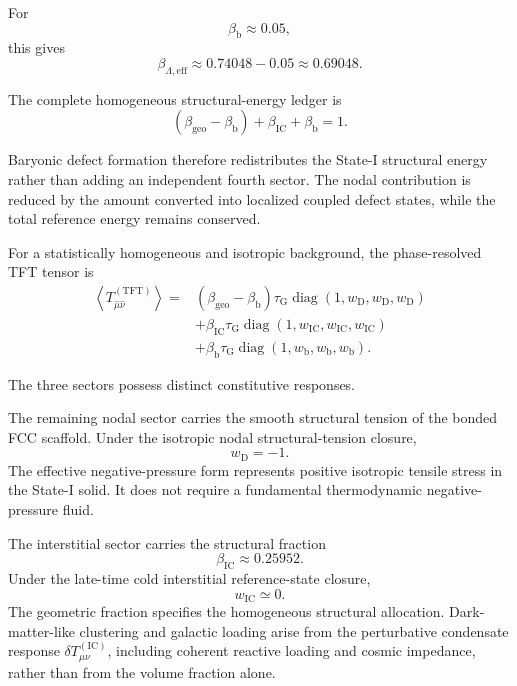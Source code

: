 For
\begin{equation}
    \beta_{\mathrm{b}} \approx 0.05,
\end{equation}
this gives
\begin{equation}
    \beta_{\Lambda,\mathrm{eff}} \approx 0.74048-0.05 \approx 0.69048.
\end{equation}

The complete homogeneous structural-energy ledger is
\begin{equation}
    \left( \beta_{\mathrm{geo}} - \beta_{\mathrm{b}} \right) + \beta_{\mathrm{IC}} + \beta_{\mathrm{b}} = 1.
\end{equation}

Baryonic defect formation therefore redistributes the State-I structural energy rather than adding an independent fourth sector. The nodal contribution is reduced by the amount converted into localized coupled defect states, while the total reference energy remains conserved.

For a statistically homogeneous and isotropic background, the phase-resolved TFT tensor is
\begin{equation}
\begin{aligned}
    \left\langle T_{\hat{\mu}\hat{\nu}}^{(\mathrm{TFT})} \right\rangle ={}& \left( \beta_{\mathrm{geo}} - \beta_{\mathrm{b}} \right) \tau_{\mathrm{G}} \operatorname{diag} \left( 1,w_{\mathrm{D}},w_{\mathrm{D}},w_{\mathrm{D}} \right) \\
    &+ \beta_{\mathrm{IC}} \tau_{\mathrm{G}} \operatorname{diag} \left( 1,w_{\mathrm{IC}},w_{\mathrm{IC}},w_{\mathrm{IC}} \right) \\
    &+ \beta_{\mathrm{b}} \tau_{\mathrm{G}} \operatorname{diag} \left( 1,w_{\mathrm{b}},w_{\mathrm{b}},w_{\mathrm{b}} \right).
\end{aligned}
\end{equation}

The three sectors possess distinct constitutive responses.

The remaining nodal sector carries the smooth structural tension of the bonded FCC scaffold. Under the isotropic nodal structural-tension closure,
\begin{equation}
    w_{\mathrm{D}} = -1.
\end{equation}
The effective negative-pressure form represents positive isotropic tensile stress in the State-I solid. It does not require a fundamental thermodynamic negative-pressure fluid.

The interstitial sector carries the structural fraction
\begin{equation}
    \beta_{\mathrm{IC}} \approx 0.25952.
\end{equation}
Under the late-time cold interstitial reference-state closure,
\begin{equation}
    w_{\mathrm{IC}} \simeq 0.
\end{equation}
The geometric fraction specifies the homogeneous structural allocation. Dark-matter-like clustering and galactic loading arise from the perturbative condensate response $\delta T_{\mu\nu}^{(\mathrm{IC})}$, including coherent reactive loading and cosmic impedance, rather than from the volume fraction alone.

